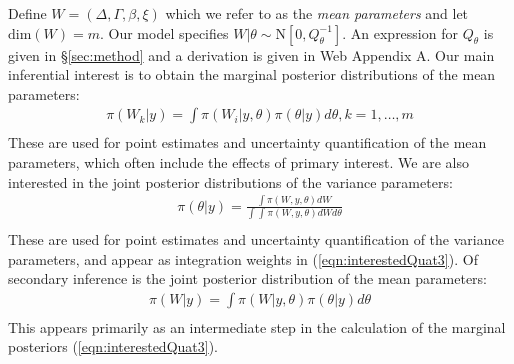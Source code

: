 \documentclass[]{article}
\begin{document}
Define $W = \left(\Delta, \Gamma,\beta, \xi \right)$ which we refer to as the \textit{mean parameters} and let $\text{dim}(W) = m$. Our model specifies $W|\theta\sim\text{N}\left[ 0,Q^{-1}_{\theta}\right]$. An expression for $Q_{\theta}$ is given in \S\ref{sec:method} and a derivation is given in Web Appendix A. Our main inferential interest is to obtain the marginal posterior distributions of the mean parameters:
\begin{equation}\begin{aligned}\label{eqn:interestedQuat3}
\pi(W_{k}|y) = \int \pi(W_i|y,\theta) \pi(\theta|y) d\theta, k = 1,\ldots,m  \\
\end{aligned}\end{equation}
These are used for point estimates and uncertainty quantification of the mean parameters, which often include the effects of primary interest. We are also interested in the joint posterior distributions of the variance parameters:
\begin{equation}\begin{aligned}\label{eqn:interestedQuat1}
\pi(\theta|y) = \frac{\int \pi(W,y,\theta) dW}{\int_{} \int_{} \pi(W,y,\theta) dW d\theta } \\
\end{aligned}\end{equation}
These are used for point estimates and uncertainty quantification of the variance parameters, and appear as integration weights in (\ref{eqn:interestedQuat3}). Of secondary inference is the joint posterior distribution of the mean parameters:
\begin{equation}\begin{aligned}\label{eqn:interestedQuat2}
\pi(W|y) = \int \pi(W|y,\theta) \pi(\theta|y) d\theta  \\
\end{aligned}\end{equation}
This appears primarily as an intermediate step in the calculation of the marginal posteriors (\ref{eqn:interestedQuat3}).
\end{document}

